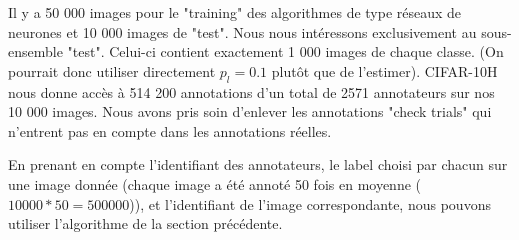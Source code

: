 \documentclass[frenchb]{report}
\newcommand{\1}{\mathbbm{1}}
\theoremstyle{definition}\newtheorem{defn}{Définition}
\theoremstyle{definition}\newtheorem{exm}{Exemple}
\theoremstyle{definition}\newtheorem{nota}{Notation}
\theoremstyle{definition}\newtheorem{rem}{Remarque}
\begin{document}
Il y a 50 000 images pour le "training" des algorithmes de type réseaux de neurones et 10 000 images de "test". Nous nous intéressons exclusivement au sous-ensemble "test". Celui-ci contient exactement 1 000 images de chaque classe. (On pourrait donc utiliser directement $p_l = 0.1$ plutôt que de l'estimer). CIFAR-10H nous donne accès à 514 200 annotations d'un total de 2571 annotateurs sur nos 10 000 images. Nous avons pris soin d'enlever les annotations "check trials" qui n'entrent pas en compte dans les annotations réelles.

\par En prenant en compte l'identifiant des annotateurs, le label choisi par chacun sur une image donnée (chaque image a été annoté 50 fois en moyenne ($10 000*50 = 500 000$)), et l'identifiant de l'image correspondante, nous pouvons utiliser l'algorithme de la section précédente.
\end{document}
